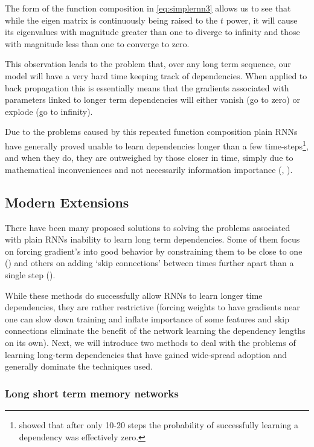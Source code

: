 \documentclass[]{book}
\let\rmarkdownfootnote\footnote%
\def\footnote{\protect\rmarkdownfootnote}
\theoremstyle{definition}
\theoremstyle{definition}
\theoremstyle{definition}
\theoremstyle{remark}
\begin{document}
The form of the function composition in \eqref{eq:simplernn3} allows us to
see that while the eigen matrix is continuously being raised to the
\(t\) power, it will cause its eigenvalues with magnitude greater than
one to diverge to infinity and those with magnitude less than one to
converge to zero.

This observation leads to the problem that, over any long term sequence,
our model will have a very hard time keeping track of dependencies. When
applied to back propagation this is essentially means that the gradients
associated with parameters linked to longer term dependencies will
either vanish (go to zero) or explode (go to infinity).

Due to the problems caused by this repeated function composition plain
RNNs have generally proved unable to learn dependencies longer than a
few time-steps\footnote{\citet{bengio_gradient} showed that after only
  10-20 steps the probability of successfully learning a dependency was
  effectively zero.}, and when they do, they are outweighed by those
closer in time, simply due to mathematical inconveniences and not
necessarily information importance (\citet{bengio_gradient},
\citet{graves_rnn}).

\subsection{Modern Extensions}\label{modern-extensions}

There have been many proposed solutions to solving the problems
associated with plain RNNs inability to learn long term dependencies.
Some of them focus on forcing gradient's into good behavior by
constraining them to be close to one (\citet{bounded_gradient_rnn}) and
others on adding `skip connections' between times further apart than a
single step (\citet{skip_connections}).

While these methods do successfully allow RNNs to learn longer time
dependencies, they are rather restrictive (forcing weights to have
gradients near one can slow down training and inflate importance of some
features and skip connections eliminate the benefit of the network
learning the dependency lengths on its own). Next, we will introduce two
methods to deal with the problems of learning long-term dependencies
that have gained wide-spread adoption and generally dominate the
techniques used.

\subsubsection{Long short term memory
networks}\label{long-short-term-memory-networks}
\end{document}
